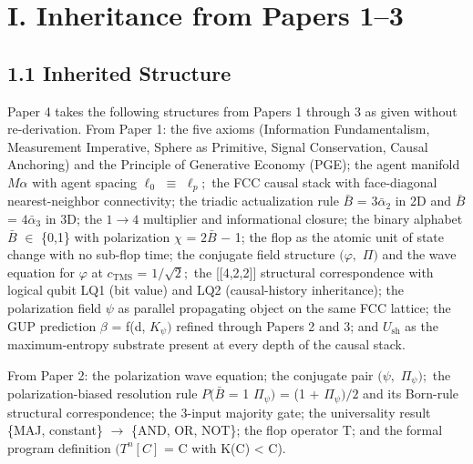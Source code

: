 \documentclass[11pt,oneside]{report}
\theoremstyle{definition}
\theoremstyle{remark}
\begin{document}
\section*{I. Inheritance from Papers 1--3}

\subsection*{1.1 Inherited Structure}

Paper 4 takes the following structures from Papers 1 through 3 as given
without re-derivation. From Paper 1: the five axioms (Information
Fundamentalism, Measurement Imperative, Sphere as Primitive, Signal
Conservation, Causal Anchoring) and the Principle of Generative Economy
(PGE); the agent manifold \ensuremath{M\alpha} with agent spacing \ensuremath{\ell_{0}} \ensuremath{\equiv} \ensuremath{\ell_{p};} the FCC causal
stack with face-diagonal nearest-neighbor connectivity; the triadic
actualization rule \ensuremath{\bar{B}} = \ensuremath{3\bar{\alpha}_{2}} in 2D and \ensuremath{\bar{B}} = \ensuremath{4\bar{\alpha}_{3}} in 3D; the \ensuremath{1\to 4} multiplier
and informational closure; the binary alphabet \ensuremath{\bar{B}} \ensuremath{\in} \{0,1\} with
polarization \ensuremath{\chi} = \ensuremath{2\bar{B}} \ensuremath{-} 1; the flop as the atomic unit of state change
with no sub-flop time; the conjugate field structure \ensuremath{(\varphi ,} \ensuremath{\Pi )} and the wave
equation for \ensuremath{\varphi} at \ensuremath{c_{\mathrm{TMS}}} = \ensuremath{1/\sqrt{2};} the [[4,2,2]] structural
correspondence with logical qubit LQ1 (bit value) and LQ2
(causal-history inheritance); the polarization field \ensuremath{\psi} as parallel
propagating object on the same FCC lattice; the GUP prediction \ensuremath{\beta} = f(d,
\ensuremath{K_{\psi})} refined through Papers 2 and 3; and \ensuremath{U_{\mathrm{sh}}} as the maximum-entropy
substrate present at every depth of the causal stack.

From Paper 2: the polarization wave equation; the conjugate pair \ensuremath{(\psi ,}
\ensuremath{\Pi_{\psi});} the polarization-biased resolution rule \ensuremath{P(\bar{B}} = 1 \textbar{} \ensuremath{\Pi_{\psi})}
= (1 + \ensuremath{\Pi_{\psi})/2} and its Born-rule structural correspondence; the 3-input
majority gate; the universality result \{MAJ, constant\} \ensuremath{\to} \{AND, OR,
NOT\}; the flop operator T; and the formal program definition
\ensuremath{(T^{n}[C]} = C with K(C) \textless{} \textbar C\textbar).
\end{document}

